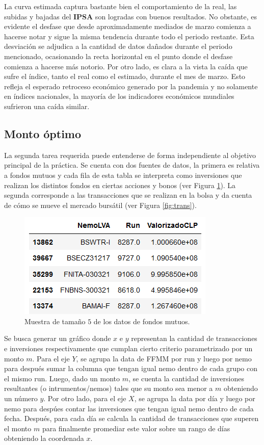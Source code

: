 \documentclass{article}
\begin{document}
	La curva estimada captura bastante bien el comportamiento de la real, las subidas y bajadas del \textbf{IPSA} son logradas con buenos resultados. No obstante, es evidente el desfase que desde aproximadamente mediados de marzo comienza a hacerse notar y sigue la misma tendencia durante todo el periodo restante. Esta desviación se adjudica a la cantidad de datos dañados durante el periodo mencionado, ocasionando la recta horizontal en el punto donde el desfase comienza a hacerse más notorio. Por otro lado, es clara a la vista la caída que sufre el índice, tanto el real como el estimado, durante el mes de marzo. Esto refleja el esperado retroceso económico generado por la pandemia y no solamente en índices nacionales, la mayoría de los indicadores económicos mundiales sufrieron una caída similar.

\subsection{Monto óptimo}
	La segunda tarea requerida puede entenderse de forma independiente al objetivo principal de la práctica. Se cuenta con dos fuentes de datos, la primera es relativa a fondos mutuos y cada fila de esta tabla se interpreta como inversiones que realizan los distintos fondos en ciertas acciones y bonos (ver Figura \ref{fig:ffmm_data_sample}). La segunda corresponde a las transacciones que se realizan en la bolsa y da cuenta de cómo se mueve el mercado bursátil (ver Figura \ref{fig:trans}).
	\begin{figure}[H]
		\centering
		\includegraphics[scale=.65]{imgs/ffmm_data_sample.png}
		\caption{Muestra de tamaño $5$ de los datos de fondos mutuos.}
		\label{fig:ffmm_data_sample}
	\end{figure}
	Se busca generar un gráfico donde $x$ e $y$ representan la cantidad de transacciones e inversiones respectivamente que cumplan cierto criterio parametrizado por un monto $m$. Para el eje $Y$,  se agrupa la data de FFMM por run y luego por nemo para después sumar la columna  que tengan igual nemo dentro de cada grupo con el mismo run. Luego, dado un monto $m$, se cuenta la cantidad de inversiones resultantes (o intrumentos/nemos) tales que su monto sea menor a $m$ obteniendo un número $y$. Por otro lado, para el eje $X$, se agrupa la data por día y luego por nemo para despúes contar las inversiones que tengan igual nemo dentro de cada fecha. Después, para cada día se calcula la cantidad de transacciones que superen el monto $m$ para finalmente promediar este valor sobre un rango de días obteniendo la coordenada $x$.
\end{document}
